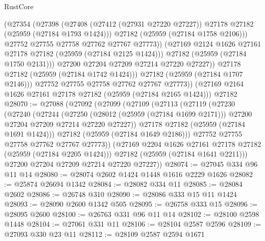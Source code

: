 \begin{lexlean}{RustCore}
\begin{coremodule}
                    (@27354
                      (@27398
                        (@27408
                          (@27412 (@27931 @27220 @27227))
                          @27178
                          @27182
                          (@25959 (@27184 @1793 @1424)))
                        @27182
                        (@25959 (@27184 @1758 @2106)))
                      @27752
                      @27755
                      @27758
                      @27762
                      @27767
                      @27773))
                  (@27169 @2124 @1626 @27161 @27178 @27182 (@25959 (@27184 @2125 @1424)))
                  @27182
                  (@25959 (@27184 @1750 @2131)))
                @27200
                @27204
                @27209
                @27214
                @27220
                @27227))
            @27178
            @27182
            (@25959 (@27184 @1742 @1424)))
          @27182
          (@25959 (@27184 @1707 @2146)))
        @27752
        @27755
        @27758
        @27762
        @27767
        @27773))
    (@27169 @2164 @1626 @27161 @27178 @27182 (@25959 (@27184 @2165 @1424)))
    @27182
@28070 := @27088
    (@27092
      (@27099
        (@27109
          (@27113
            (@27119
              (@27230
                (@27240
                  (@27244
                    (@27250
                      (@28012 (@25959 (@27184 @1699 @2171)))
                      @27200
                      @27204
                      @27209
                      @27214
                      @27220
                      @27227))
                  @27178
                  @27182
                  (@25959 (@27184 @1691 @1424)))
                @27182
                (@25959 (@27184 @1649 @2186)))
              @27752
              @27755
              @27758
              @27762
              @27767
              @27773))
          (@27169 @2204 @1626 @27161 @27178 @27182 (@25959 (@27184 @2205 @1424)))
          @27182
          (@25959 (@27184 @1641 @2211)))
        @27200
        @27204
        @27209
        @27214
        @27220
        @27227))
@28074 := @27045 @334 @96 @11 @14
@28080 := @28074 @2602 @1424 @1448 @1616 @2229 @1626
@28082 := @25874 @26694 @1342
@28084 := @28082 @334 @11
@28085 := @28084 @2602
@28086 := @26748 @310
@28090 := @28086 @333 @15 @11 @1424
@28093 := @28090 @2600 @1342 @505
@28095 := @26758 @333 @15
@28096 := @28095 @2600
@28100 := @26763 @331 @96 @11 @14
@28102 := @28100 @2598 @1448
@28104 := @27061 @331 @11
@28106 := @28104 @2587 @2596
@28109 := @27093 @330 @23 @11
@28112 := @28109 @2587 @2594 @1671

\end{coremodule}
\end{lexlean}
